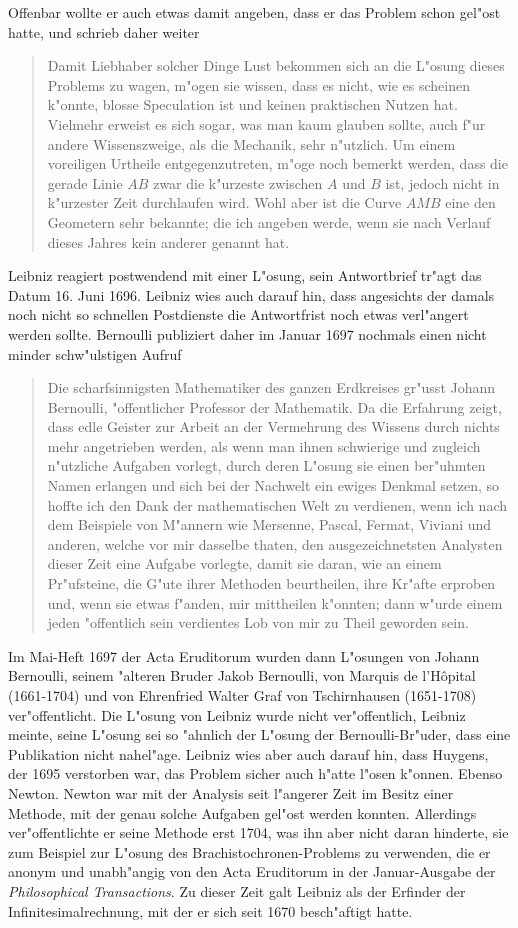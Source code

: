 Offenbar wollte er auch etwas damit angeben, dass er das Problem
schon gel"ost hatte, und schrieb daher weiter
\begin{quote}
Damit Liebhaber solcher Dinge Lust bekommen sich an die L"osung
dieses Problems zu wagen, m"ogen sie wissen, dass es nicht, wie es
scheinen k"onnte, blosse Speculation ist und keinen praktischen
Nutzen hat. Vielmehr erweist es sich sogar, was man kaum glauben
sollte, auch f"ur andere Wissenszweige, als die Mechanik, sehr
n"utzlich. Um einem voreiligen Urtheile entgegenzutreten, m"oge noch
bemerkt werden, dass die gerade Linie $AB$ zwar die k"urzeste zwischen
$A$ und $B$ ist, jedoch nicht in k"urzester Zeit durchlaufen wird. Wohl
aber ist die Curve $AMB$ eine den Geometern sehr bekannte; die ich
angeben werde, wenn sie nach Verlauf dieses Jahres kein anderer
genannt hat.
\end{quote}
Leibniz reagiert postwendend mit einer L"osung, sein Antwortbrief tr"agt
das Datum 16. Juni 1696. Leibniz wies auch darauf hin, dass angesichts
der damals noch nicht so schnellen Postdienste die Antwortfrist noch
etwas verl"angert werden sollte.
Bernoulli publiziert daher im Januar 1697 nochmals einen nicht
minder schw"ulstigen Aufruf
\begin{quote}
Die scharfsinnigsten Mathematiker des ganzen Erdkreises gr"usst
Johann Bernoulli, "offentlicher Professor der Mathematik.
Da die Erfahrung zeigt, dass edle Geister zur Arbeit an der Vermehrung
des Wissens durch nichts mehr angetrieben werden, als wenn man ihnen
schwierige und zugleich n"utzliche Aufgaben vorlegt, durch deren
L"osung sie einen ber"uhmten Namen erlangen und sich bei der Nachwelt
ein ewiges Denkmal setzen, so hoffte ich den Dank der mathematischen
Welt zu verdienen, wenn ich nach dem Beispiele von M"annern wie
Mersenne, Pascal, Fermat, Viviani und anderen, welche vor mir
dasselbe thaten, den ausgezeichnetsten Analysten dieser Zeit eine
Aufgabe vorlegte, damit sie daran, wie an einem Pr"ufsteine, die
G"ute ihrer Methoden beurtheilen, ihre Kr"afte erproben und, wenn sie
etwas f"anden, mir mittheilen k"onnten; dann w"urde einem jeden
"offentlich sein verdientes Lob von mir zu Theil geworden sein.
\end{quote}
Im Mai-Heft 1697 der Acta Eruditorum wurden dann L"osungen von
Johann Bernoulli, seinem "alteren Bruder Jakob Bernoulli, von Marquis
de l'H\^opital (1661-1704) und
von Ehrenfried Walter Graf von Tschirnhausen (1651-1708)
ver"offentlicht.
Die L"osung von Leibniz wurde nicht ver"offentlich, Leibniz
meinte, seine L"osung sei so "ahnlich der L"osung der Bernoulli-Br"uder,
dass eine Publikation nicht nahel"age. Leibniz wies aber auch darauf hin,
dass Huygens, der 1695 verstorben war, das Problem sicher auch h"atte l"osen
k"onnen. Ebenso Newton.
Newton war mit der Analysis seit l"angerer Zeit im Besitz einer Methode,
mit der genau solche Aufgaben gel"ost werden konnten.
Allerdings ver"offentlichte er seine Methode erst 1704, was ihn
aber nicht daran hinderte, sie zum Beispiel zur L"osung des
Brachistochronen-Problems zu verwenden, die er anonym und unabh"angig von
den Acta Eruditorum in der Januar-Ausgabe der {\it Philosophical Transactions}.
Zu dieser Zeit galt Leibniz als der Erfinder der Infinitesimalrechnung,
mit der er sich seit 1670 besch"aftigt hatte.


